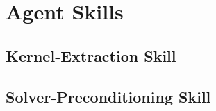 \chapter{Agent Skills}
\label{ch:skills}

\section{Kernel-Extraction Skill}

\section{Solver-Preconditioning Skill}
